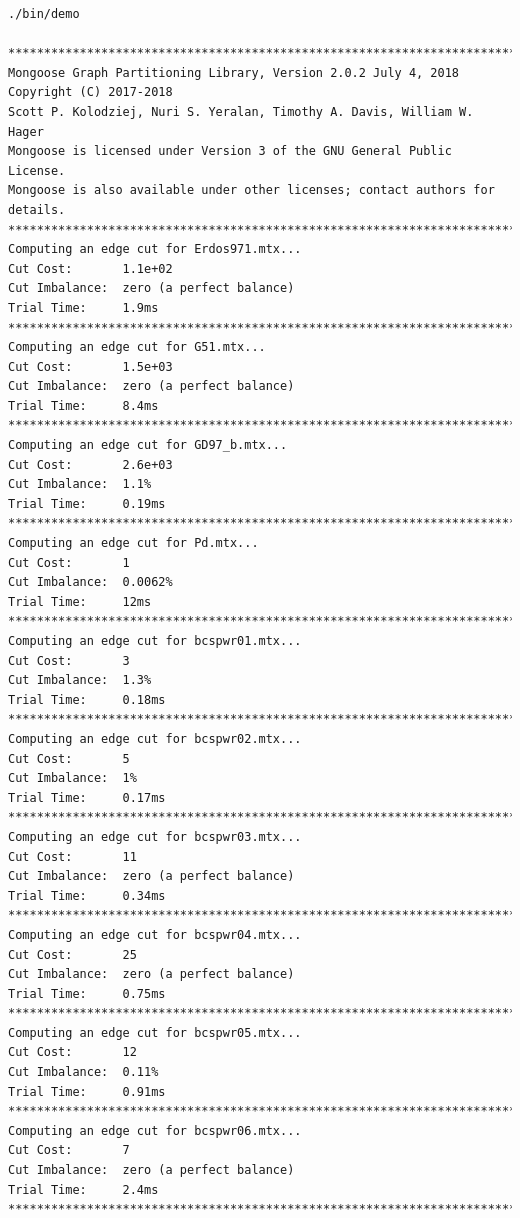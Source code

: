 \documentclass[letter]{article}
\begin{document}
\begin{lstlisting}[numbers=none,xleftmargin=.09\textwidth, xrightmargin=.09\textwidth,keywordstyle=\color{black}]
./bin/demo

********************************************************************************
Mongoose Graph Partitioning Library, Version 2.0.2 July 4, 2018
Copyright (C) 2017-2018
Scott P. Kolodziej, Nuri S. Yeralan, Timothy A. Davis, William W. Hager
Mongoose is licensed under Version 3 of the GNU General Public License.
Mongoose is also available under other licenses; contact authors for details.
********************************************************************************
Computing an edge cut for Erdos971.mtx...
Cut Cost:       1.1e+02
Cut Imbalance:  zero (a perfect balance)
Trial Time:     1.9ms
********************************************************************************
Computing an edge cut for G51.mtx...
Cut Cost:       1.5e+03
Cut Imbalance:  zero (a perfect balance)
Trial Time:     8.4ms
********************************************************************************
Computing an edge cut for GD97_b.mtx...
Cut Cost:       2.6e+03
Cut Imbalance:  1.1%
Trial Time:     0.19ms
********************************************************************************
Computing an edge cut for Pd.mtx...
Cut Cost:       1
Cut Imbalance:  0.0062%
Trial Time:     12ms
********************************************************************************
Computing an edge cut for bcspwr01.mtx...
Cut Cost:       3
Cut Imbalance:  1.3%
Trial Time:     0.18ms
********************************************************************************
Computing an edge cut for bcspwr02.mtx...
Cut Cost:       5
Cut Imbalance:  1%
Trial Time:     0.17ms
********************************************************************************
Computing an edge cut for bcspwr03.mtx...
Cut Cost:       11
Cut Imbalance:  zero (a perfect balance)
Trial Time:     0.34ms
********************************************************************************
Computing an edge cut for bcspwr04.mtx...
Cut Cost:       25
Cut Imbalance:  zero (a perfect balance)
Trial Time:     0.75ms
********************************************************************************
Computing an edge cut for bcspwr05.mtx...
Cut Cost:       12
Cut Imbalance:  0.11%
Trial Time:     0.91ms
********************************************************************************
Computing an edge cut for bcspwr06.mtx...
Cut Cost:       7
Cut Imbalance:  zero (a perfect balance)
Trial Time:     2.4ms
********************************************************************************

\end{lstlisting}
\end{document}
